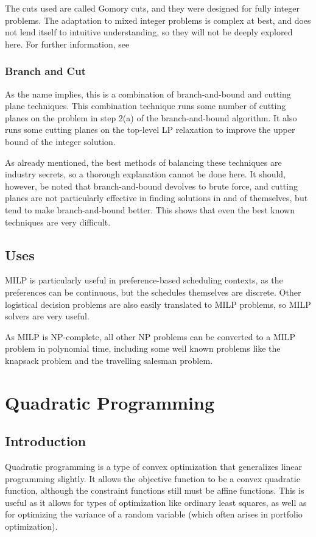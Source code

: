 \documentclass[10pt]{article}
\begin{document}
The cuts used are called Gomory cuts, and they were designed for fully integer problems. The adaptation to mixed integer problems is complex at best, and does not lend itself to intuitive understanding, so they will not be deeply explored here. For further information, see \cite{marchand-cp}
\subsubsection{Branch and Cut}
As the name implies, this is a combination of branch-and-bound and cutting plane techniques. This combination technique runs some number of cutting planes on the problem in step 2(a) of the branch-and-bound algorithm. It also runs some cutting planes on the top-level LP relaxation to improve the upper bound of the integer solution.

As already mentioned, the best methods of balancing these techniques are industry secrets, so a thorough explanation cannot be done here. It should, however, be noted that branch-and-bound devolves to brute force\cite{pataki-comp-bnb}, and cutting planes are not particularly effective in finding solutions in and of themselves, but tend to make branch-and-bound better. This shows that even the best known techniques are very difficult.
\subsection{Uses}
MILP is particularly useful in preference-based scheduling contexts, as the preferences can be continuous, but the schedules themselves are discrete\cite{gurobi-bbl-cs}\cite{gurobi-nfl-cs}. Other logistical decision problems are also easily translated to MILP problems\cite{gurobi-ppo-cs}, so MILP solvers are very useful.

As MILP is NP-complete, all other NP problems can be converted to a MILP problem in polynomial time, including some well known problems like the knapsack problem and the travelling salesman problem\cite{karp}.
\section{Quadratic Programming}
\subsection{Introduction}
Quadratic programming is a type of convex optimization that generalizes linear programming slightly. It allows the objective function to be a convex quadratic function, although the constraint functions still must be affine functions. This is useful as it allows for types of optimization like ordinary least squares, as well as for optimizing the variance of a random variable (which often arises in portfolio optimization)\cite{boyd}.
\end{document}
